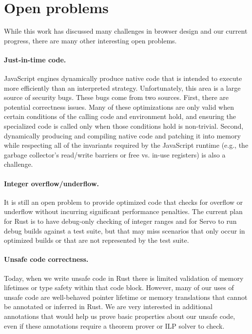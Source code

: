 
\section{Open problems}
\label{sec:open}
While this work has discussed many challenges in browser design and our current progress,
there are many other interesting open problems.

\paragraph{Just-in-time code.} JavaScript engines dynamically produce native code that is
intended to execute more efficiently than an interpreted strategy.
Unfortunately, this area is a large source of security bugs.
These bugs come from two sources.
First, there are potential correctness issues.
Many of these optimizations are only valid when certain conditions of the calling
code and environment hold, and ensuring the specialized code is called only when those
conditions hold is non-trivial.
Second, dynamically producing and compiling native code and patching it into memory
while respecting all of the invariants required by the JavaScript runtime (e.g., the
garbage collector's read/write barriers or free vs. in-use registers) is also a challenge.

\paragraph{Integer overflow/underflow.} It is still an open problem
to provide optimized code that checks for overflow or underflow without
incurring significant performance penalties.
The current plan for Rust is to have debug-only checking of integer ranges
and for Servo to run debug builds against a test suite, but that may miss
scenarios that only occur in optimized builds or that are not represented
by the test suite.

\paragraph{Unsafe code correctness.} Today, when we write unsafe code in Rust
there is limited validation of memory lifetimes or type safety within that
code block.
However, many of our uses of unsafe code are well-behaved pointer lifetime
or memory translations that cannot be annotated or inferred in Rust.
We are very interested in additional annotations that would help us prove
basic properties about our unsafe code, even if these annotations require a
theorem prover or ILP solver to check.

